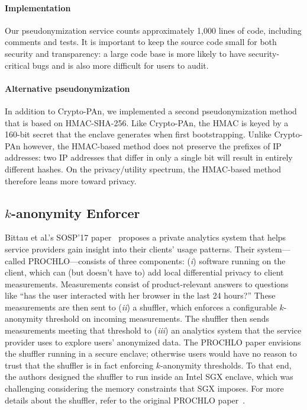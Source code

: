 \paragraph{Implementation}
Our pseudonymization service counts approximately 1,000 lines of code, including
comments and tests.  It is important to keep the source code small for both
security and transparency: a large code base is more likely to have
security-critical bugs and is also more difficult for users to audit.

\paragraph{Alternative pseudonymization}
In addition to Crypto-PAn, we implemented a second pseudonymization method that
is based on HMAC-SHA-256.  Like Crypto-PAn, the HMAC is keyed by a 160-bit
secret that the enclave generates when first bootstrapping.  Unlike Crypto-PAn
however, the HMAC-based method does not preserve the prefixes of IP addresses:
two IP addresses that differ in only a single bit will result in entirely
different hashes.  On the privacy/utility spectrum, the HMAC-based method
therefore leans more toward privacy.

\subsection{$k$-anonymity Enforcer}
\label{sec:shuffler}

Bittau et al.'s SOSP'17 paper~\cite{Bittau2017a} proposes a private analytics
system that helps service providers gain insight into their clients' usage
patterns.  Their system---called PROCHLO---consists of three components:
(\emph{i}) software running on the client, which can (but doesn't have to) add
local differential privacy to client measurements.  Measurements consist of
product-relevant answers to questions like ``has the user interacted with her
browser in the last 24 hours?'' These measurements are then sent to (\emph{ii})
a shuffler, which enforces a configurable $k$-anonymity threshold on incoming
measurements.  The shuffler then sends measurements meeting that threshold to
(\emph{iii}) an analytics system that the service provider uses to explore
users' anonymized data.  The PROCHLO paper envisions the shuffler running in a
secure enclave; otherwise users would have no reason to trust that the shuffler
is in fact enforcing $k$-anonymity thresholds.  To that end, the authors
designed the shuffler to run inside an Intel SGX enclave, which was challenging
considering the memory constraints that SGX imposes.  For more details about the
shuffler, refer to the original PROCHLO paper~\cite[\S~3.3]{Bittau2017a}.

